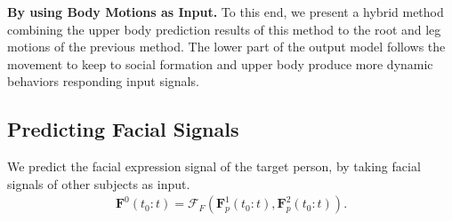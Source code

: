 \textbf{By using Body Motions as Input.} To this end, we present a hybrid method combining the upper body prediction results of this method to the root and leg motions of the previous method. The lower part of the output model follows the movement to keep to social formation and upper body produce more dynamic behaviors responding input signals.

\subsection{Predicting Facial Signals}
We predict the facial expression signal of the target person, by taking facial signals of other subjects as input. 
\begin{gather}	
\mathbf{F}^0(t_0:t) = \mathcal{F}_{F} \left( \mathbf{F}_p^1(t_0:t), \mathbf{F}_p^2(t_0:t) \right).
\end{gather}